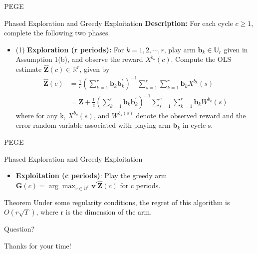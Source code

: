 \documentclass[serif]{beamer}
\begin{document}
\begin{frame}{PEGE}

\begin{block}{Phased Exploration and Greedy Exploitation}
\textbf{Description:} For each cycle $c\geq 1$, complete the following two phases.
\begin{itemize}
\item (1) \textbf{Exploration (r periods):} For $k=1,2,\cdots,r$, play arm $\textbf{b}_{k}\in \mathbb{U}_{r}$ given in Assumption 1(b), and observe the reward $X^{b_{k}}(c)$. Compute the OLS estimate $\hat{\textbf{Z}}(c)\in \mathbb{R}^{r}$, given by
\begin{align}
\hat{\textbf{Z}}(c)&=\frac{1}{c}(\sum_{k=1}^{r}\textbf{b}_{k}\textbf{b}_{k}^{'})^{-1}\sum_{s=1}^{c}\sum_{k=1}^{r}\textbf{b}_{k}X^{b_{k}}(s) \nonumber \\
&=\textbf{Z}+\frac{1}{c}(\sum_{k=1}^{r}\textbf{b}_{k}\textbf{b}_{k}^{'})^{-1}\sum_{s=1}^{c}\sum_{k=1}^{r}\textbf{b}_{k}W^{b_{k}}(s) \nonumber 
\end{align}
where for any k, $X^{b_{k}}(s)$, and $W^{b_{k}(s)}$ denote the observed reward and the error random variable associated with playing arm $\textbf{b}_{k}$ in cycle s.
\end{itemize}

\end{block}

\end{frame}

\begin{frame}{PEGE}

\begin{block}{Phased Exploration and Greedy Exploitation}
\begin{itemize}
\item \textbf{Exploitation (c periods)}: Play the greedy arm $\textbf{G}(c)=\arg \max_{v\in \mathbb{U}^{r}}\textbf{v}^{'}\hat{\textbf{Z}}(c)$ for c periods.
\end{itemize}
\end{block}

\begin{block}{Theorem}
Under some regularity conditions, the regret of this algorithm is $O(r\sqrt{T})$, where r is the dimension of the arm.
\end{block}

\end{frame}





\begin{frame}{Question?}
\begin{center}
\Huge{Thanks for your time!}
\end{center}
\end{frame}
\end{document}
